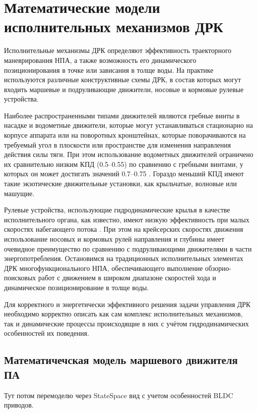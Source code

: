 \chapter{Математические модели исполнительных механизмов ДРК}\label{ch:Propulsion}

Исполнительные механизмы ДРК определяют эффективность траекторного маневрирования НПА, а также возможность его динамического позиционирования в точке или зависания в толще воды.
На практике используются различные конструктивные схемы ДРК, в состав которых могут входить маршевые и подруливающие движители, носовые и кормовые рулевые устройства.

Наиболее распространенными типами движителей являются гребные винты в насадке и водометные движители, которые могут устанавливаться стационарно на корпусе аппарата или на поворотных кронштейнах, которые поворачиваются на требуемый угол в плоскости или пространстве для изменения направления действия силы тяги.
При этом использование водометных движителей ограничено их сравнительно низким КПД (0.5–0.55) по сравнению с гребными винтами, у которых он может достигать значений 0.7–0.75 \cite{инзарцев2018подводные}. Гораздо меньший КПД имеют такие экзотические движительные установки, как крыльчатые, волновые или машущие. 

Рулевые устройства, использующие гидродинамические крылья в качестве исполнительного органа, как известно, имеют низкую эффективность при малых скоростях набегающего потока \cite{агеев2015авто}.
При этом на крейсерских скоростях движения использование носовых и кормовых рулей направления и глубины имеет очевидное преимущество по сравнению с подруливающими движителями в части энергопотребления.
Остановимся на традиционных исполнительных элементах ДРК многофункционального НПА, обеспечивающего выполнение обзорно-поисковых работ с движением в широком диапазоне скоростей хода и динамическое позиционирование в толще воды.

Для корректного и энергетически эффективного решения задачи управления ДРК необходимо корректно описать как сам комплекс исполнительных механизмов, так и динамические процессы происходящие в них с учётом гидродинамических особенностей их поведения.

\section{Математичечская модель маршевого движителя ПА}

\begin{noteplan}
	Тут потом перемоделю через StateSpace вид с учетом особенностей BLDC приводов.
\end{noteplan}

